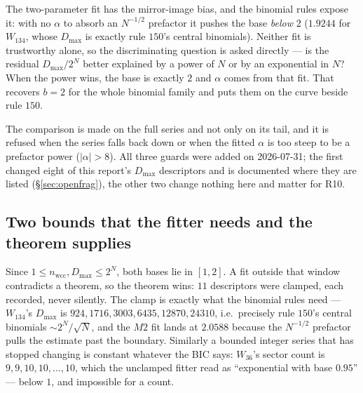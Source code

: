 \documentclass[11pt]{article}
\newcommand{\wcc}{\mathrm{wcc}}
\theoremstyle{plain}
\theoremstyle{definition}
\begin{document}
\noindent The two-parameter fit has the mirror-image bias, and the binomial rules
expose it: with no $\alpha$ to absorb an $N^{-1/2}$ prefactor it pushes the base
\emph{below} $2$ ($1.9244$ for $W_{134}$, whose $D_{\max}$ is exactly rule $150$'s
central binomials). Neither fit is trustworthy alone, so the discriminating
question is asked directly --- is the residual $D_{\max}/2^N$ better explained by
a power of $N$ or by an exponential in $N$? When the power wins, the base is
exactly $2$ and $\alpha$ comes from that fit. That recovers $b=2$ for the whole
binomial family and puts them on the curve beside rule $150$.

The comparison is made on the full series and not only on its tail, and it is
refused when the series falls back down or when the fitted $\alpha$ is too steep
to be a prefactor power ($|\alpha|>8$). All three guards were added on
2026-07-31; the first changed eight of this report's $D_{\max}$ descriptors and
is documented where they are listed (\S\ref{sec:openfrag}), the other two change
nothing here and matter for R10.

\subsection{Two bounds that the fitter needs and the theorem supplies}
\label{sec:inconclusive}

Since $1\le n_\wcc,D_{\max}\le 2^N$, both bases lie in $[1,2]$. A fit outside
that window contradicts a theorem, so the theorem wins: $11$ descriptors were
clamped, each recorded, never silently. The clamp is exactly what the binomial
rules need --- $W_{134}$'s $D_{\max}$ is $924,1716,3003,6435,12870,24310$, i.e.\
precisely rule $150$'s central binomials $\sim2^N/\sqrt N$, and the $M2$ fit
lands at $2.0588$ because the $N^{-1/2}$ prefactor pulls the estimate past the
boundary. Similarly a bounded integer series that has stopped changing is
constant whatever the BIC says: $W_{36}$'s sector count is
$9,9,10,10,\ldots,10$, which the unclamped fitter read as ``exponential with
base $0.95$'' --- below $1$, and impossible for a count.
\end{document}
